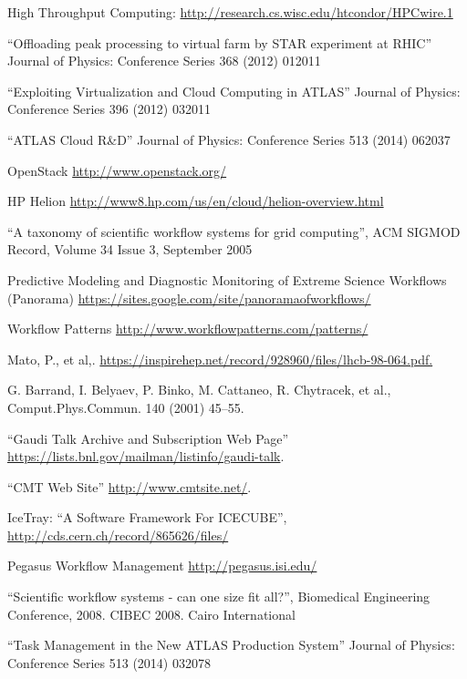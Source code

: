 \begin{thebibliography}{99}
 High Throughput Computing: \url{http://research.cs.wisc.edu/htcondor/HPCwire.1}

 ``Offloading peak processing to virtual farm by STAR experiment at RHIC'' Journal of Physics: Conference Series 368 (2012) 012011

 ``Exploiting Virtualization and Cloud Computing in ATLAS'' Journal of Physics: Conference Series 396 (2012) 032011

 ``ATLAS Cloud R\&D'' Journal of Physics: Conference Series 513 (2014) 062037

 OpenStack \url{http://www.openstack.org/}

 HP Helion \url{http://www8.hp.com/us/en/cloud/helion-overview.html}

 ``A taxonomy of scientific workflow systems for grid computing'', ACM SIGMOD Record, Volume 34 Issue 3, September 2005

 Predictive Modeling and Diagnostic Monitoring of Extreme Science Workflows (Panorama) \url{https://sites.google.com/site/panoramaofworkflows/}

 Workflow Patterns \url{http://www.workflowpatterns.com/patterns/}

 Mato, P., et al,. \url{https://inspirehep.net/record/928960/files/lhcb-98-064.pdf.}

 G. Barrand, I. Belyaev, P. Binko, M. Cattaneo, R. Chytracek, et al., Comput.Phys.Commun. 140
(2001) 45–55.

 ``Gaudi Talk Archive and Subscription Web Page'' \url{https://lists.bnl.gov/mailman/listinfo/gaudi-talk}.

 ``CMT Web Site'' \url{http://www.cmtsite.net/}.

 IceTray: ``A Software Framework For ICECUBE'', \url{http://cds.cern.ch/record/865626/files/}

 Pegasus Workflow Management \url{http://pegasus.isi.edu/}

 ``Scientific workflow systems - can one size fit all?'', Biomedical Engineering Conference, 2008. CIBEC 2008. Cairo International

 ``Task Management in the New ATLAS Production System'' Journal of Physics: Conference Series 513 (2014) 032078


\end{thebibliography}
